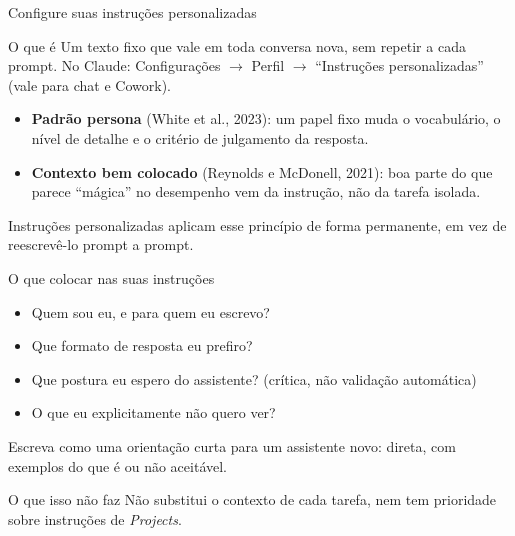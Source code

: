 \documentclass[11pt,aspectratio=169,t]{beamer}
\begin{document}
\begin{frame}{Configure suas instruções personalizadas}
  \small
  \begin{block}{O que é}
    Um texto fixo que vale em toda conversa nova, sem repetir a cada
    prompt. No Claude: Configurações $\rightarrow$ Perfil
    $\rightarrow$ ``Instruções personalizadas'' (vale para chat e Cowork).
  \end{block}
  \pause
  \vfill
  \begin{itemize}
    \item \textbf{Padrão persona} (White et al., 2023): um papel fixo muda o vocabulário, o nível de detalhe e o critério de julgamento da resposta.
    \item \textbf{Contexto bem colocado} (Reynolds e McDonell, 2021): boa parte do que parece ``mágica'' no desempenho vem da instrução, não da tarefa isolada.
  \end{itemize}
  \pause
  \vfill
  \begin{alertblock}{}
    \centering Instruções personalizadas aplicam esse princípio de forma
    permanente, em vez de reescrevê-lo prompt a prompt.
  \end{alertblock}
\end{frame}

\begin{frame}{O que colocar nas suas instruções}
  \small
  \begin{itemize}
    \item[$\square$] Quem sou eu, e para quem eu escrevo?
    \item[$\square$] Que formato de resposta eu prefiro?
    \item[$\square$] Que postura eu espero do assistente? (crítica, não
    validação automática)
    \item[$\square$] O que eu explicitamente não quero ver?
  \end{itemize}
  \pause
  \vfill
  \begin{exampleblock}{}
    \small Escreva como uma orientação curta para um assistente novo:
    direta, com exemplos do que é ou não aceitável.
  \end{exampleblock}
  \pause
  \vfill
  \begin{alertblock}{O que isso não faz}
    \small\centering Não substitui o contexto de cada tarefa, nem tem
    prioridade sobre instruções de \textit{Projects}.
  \end{alertblock}
\end{frame}
\end{document}
